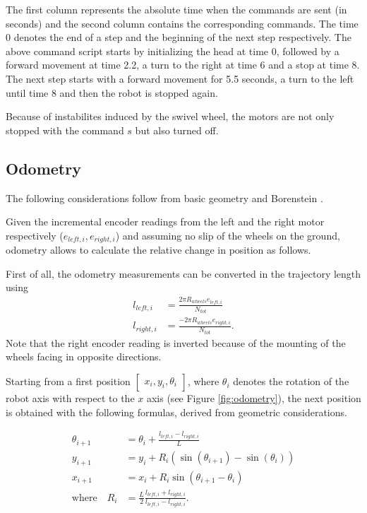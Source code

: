 The first column represents the absolute time when the commands are sent (in seconds) and the second column contains the corresponding commands.
The time 0 denotes the end of a step and the beginning of the next step respectively.
The above command script starts by initializing the head at time 0, followed by a forward movement at time 2.2, a turn to the right at time 6 and a stop at time 8.
The next step starts with a forward movement for 5.5 seconds, a turn to the left until time 8 and then the robot is stopped again.

Because of instabilites induced by the swivel wheel, the motors are not only stopped with the command $s$ but also turned off.

\newpage
\subsection{Odometry}


The following considerations follow from basic geometry and Borenstein \cite{Borenstein1996}.

Given the incremental encoder readings from the left and the right motor respectively ($e_{left,i},e_{right,i}$) and assuming no slip of the wheels on the ground, odometry allows to calculate the relative change in position as follows.

First of all, the odometry measurements can be converted in the trajectory length using
\begin{align}
    l_{left,i} &= \frac{2\pi R_{wheels} e_{left,i}}{N_{tot}} \\
    l_{right,i} &= \frac{-2\pi R_{wheels} e_{right,i}}{N_{tot}}.
    \label{eq:encoders} 
\end{align}
Note that the right encoder reading is inverted because of the mounting of the wheels facing in opposite directions.

Starting from a first position $\begin{bmatrix} x_i,y_i,\theta_i \end{bmatrix}$, where $\theta_i$ denotes the rotation of the robot axis with respect to the $x$ axis (see Figure \ref{fig:odometry}), the next position is obtained with the following formulas, derived from geometric considerations.

\begin{subequations}
    \begin{align}
        \theta_{i+1} &= \theta_i + \frac{l_{left,i}-l_{right,i}}{L} \\
        y_{i+1} &= y_i + R_i (\sin(\theta_{i+1})-\sin(\theta_{i})) \\
        x_{i+1} &= x_i + R_i \sin(\theta_{i+1}-\theta_i) \\
        \text{where} \quad R_{i} &= \frac{L}{2} \frac{l_{left,i}+l_{right,i}}{l_{left,i}-l_{right,i}}.
    \label{eq:positions}
\end{align}
\end{subequations}

